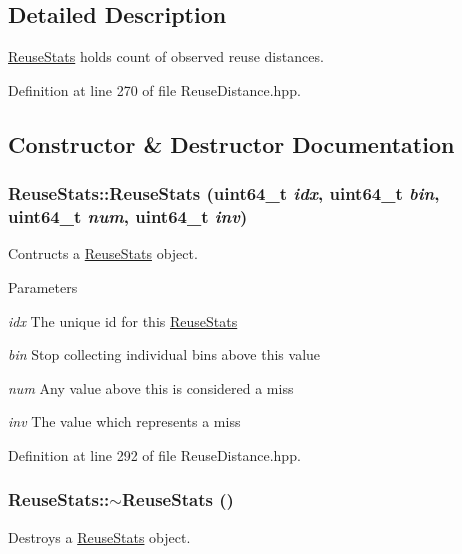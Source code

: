 \subsection{Detailed Description}
\hyperlink{class_reuse_stats}{ReuseStats} holds count of observed reuse distances. 

Definition at line 270 of file ReuseDistance.hpp.



\subsection{Constructor \& Destructor Documentation}
\hypertarget{class_reuse_stats_a8e2f08c38fb9d1df602c97832d796f3b}{
\subsubsection[{ReuseStats}]{\setlength{\rightskip}{0pt plus 5cm}ReuseStats::ReuseStats (uint64\_\-t {\em idx}, \/  uint64\_\-t {\em bin}, \/  uint64\_\-t {\em num}, \/  uint64\_\-t {\em inv})}}
\label{class_reuse_stats_a8e2f08c38fb9d1df602c97832d796f3b}
Contructs a \hyperlink{class_reuse_stats}{ReuseStats} object.


\begin{DoxyParams}{Parameters}
\item[{\em idx}]The unique id for this \hyperlink{class_reuse_stats}{ReuseStats} \item[{\em bin}]Stop collecting individual bins above this value \item[{\em num}]Any value above this is considered a miss \item[{\em inv}]The value which represents a miss \end{DoxyParams}


Definition at line 292 of file ReuseDistance.hpp.

\hypertarget{class_reuse_stats_a21f8a5cab3976edba08c2562c3ed8d45}{
\subsubsection[{$\sim$ReuseStats}]{\setlength{\rightskip}{0pt plus 5cm}ReuseStats::$\sim$ReuseStats ()}}
\label{class_reuse_stats_a21f8a5cab3976edba08c2562c3ed8d45}
Destroys a \hyperlink{class_reuse_stats}{ReuseStats} object. 

